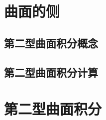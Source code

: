 \section{曲面的侧}
\subsection{第二型曲面积分概念}
\subsection{第二型曲面积分计算}
\section{第二型曲面积分}
\begin{exercise}

\end{exercise}
\begin{exercise*}

\end{exercise*}




\endinput
